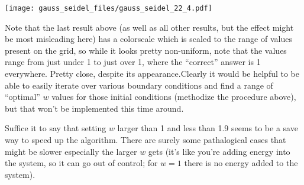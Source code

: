 \documentclass[letterpaper,10pt,english]{/usr/local/lib/python2.7/dist-packages/sphinx/texinputs/sphinxhowto}
\newenvironment{InvisibleVerbatim}
        {\begin{mdframed}[leftmargin=0.1\linewidth,innerleftmargin=3pt,innerrightmargin=3pt, userdefinedwidth=1\linewidth, linewidth=0pt, linecolor=white, usetwoside=false]}
        {\end{mdframed}}
\begin{document}
                \begin{InvisibleVerbatim}
                \vspace{-0.5\baselineskip}
    \begin{center}
    \texttt{[image: gauss\_seidel\_files/gauss\_seidel\_22\_4.pdf]}
    \par
    \end{center}
    
            \end{InvisibleVerbatim}
            
        
    
Note that the last result above (as well as all other results, but the
effect might be most misleading here) has a colorscale which is scaled
to the range of values present on the grid, so while it looks pretty
non-uniform, note that the values range from just under 1 to just over
1, where the ``correct'' answer is 1 everywhere. Pretty close, despite
its appearance.Clearly it would be helpful to be able to easily iterate over various
boundary conditions and find a range of ``optimal'' $w$ values for those
initial conditions (methodize the procedure above), but that won't be
implemented this time around.

Suffice it to say that setting $w$ larger than 1 and less than 1.9 seems
to be a save way to speed up the algorithm. There are surely some
pathalogical cases that might be slower especially the larger $w$ gets
(it's like you're adding energy into the system, so it can go out of
control; for $w=1$ there is no energy added to the system).
        

        \renewcommand{\indexname}{Index}
        \printindex

    
\end{document}
